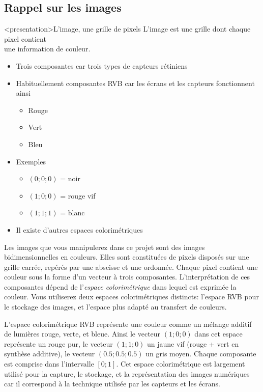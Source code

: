 \subsection{Rappel sur les images}
\label{sec:intro_image}

\begin{frame}<presentation>{L'image, une grille de pixels}
  L'image est une grille dont chaque pixel contient\\
  une information de couleur.

  \pause

  \begin{itemize}
  \item Trois composantes car trois types de capteurs rétiniens
  \item Habituellement composantes RVB car les écrans et les capteurs
    fonctionnent ainsi
    \begin{itemize}
    \item Rouge
    \item Vert
    \item Bleu
    \end{itemize}

  \pause

  \item Exemples
    \begin{itemize}
    \item $(0; 0; 0)$ = noir
    \item $(1; 0; 0)$ = rouge vif
    \item $(1; 1; 1)$ = blanc
    \end{itemize}

    \pause

  \item Il existe d'autres \alert{espaces colorimétriques}
  \end{itemize}
\end{frame}

Les images que vous manipulerez dans ce projet sont des images
bidimensionnelles en couleurs. Elles sont constituées de pixels disposés sur
une grille carrée, repérés par une abscisse et une ordonnée. Chaque pixel
contient une couleur sous la forme d'un vecteur à trois composantes.
L'interprétation de ces composantes dépend de l'\emph{espace colorimétrique}
dans lequel est exprimée la couleur. Vous utiliserez deux espaces
colorimétriques distincts: l'espace RVB pour le stockage des images, et
l'espace \lAB plus adapté au transfert de couleurs.

L'espace colorimétrique RVB représente une couleur comme un mélange additif de
lumières rouge, verte, et bleue. Ainsi le vecteur $(1; 0; 0)$ dans cet espace
représente un rouge pur, le vecteur $(1; 1; 0)$ un jaune vif (rouge + vert en
synthèse additive), le vecteur $(\num{0.5}; \num{0.5}; \num{0.5})$ un gris
moyen. Chaque composante est comprise dans l'intervalle $[0; 1]$. Cet espace
colorimétrique est largement utilisé pour la capture, le stockage, et la
représentation des images numériques car il correspond à la technique utilisée
par les capteurs et les écrans.

